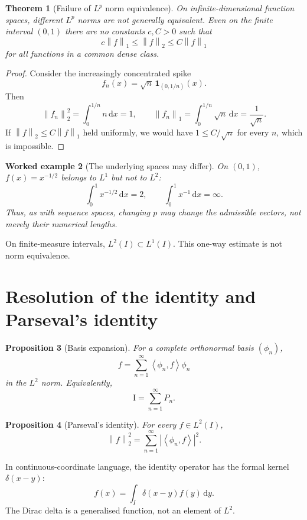\documentclass[11pt,a5paper,oneside,openany]{scrreprt}
\theoremstyle{notes}
\newtheorem{theorem}{Theorem}[section]
\newtheorem{proposition}[theorem]{Proposition}
\theoremstyle{definitions}
\newtheorem{example}[theorem]{Worked example}
\newcommand{\ip}[2]{\left\langle #1,#2\right\rangle}
\newcommand{\norm}[1]{\left\lVert #1\right\rVert}
\newcommand{\Id}{\mathrm{I}}
\newcommand{\dd}{\,\mathrm{d}}
\newcommand{\one}{\mathbf{1}}
\begin{document}
\begin{theorem}[Failure of $L^p$ norm equivalence]
On infinite-dimensional function spaces, different $L^p$ norms are not
generally equivalent.  Even on the finite interval $(0,1)$ there are no
constants $c,C>0$ such that
\[
 c\norm{f}_1\le\norm{f}_2\le C\norm{f}_1
\]
for all functions in a common dense class.
\end{theorem}

\begin{proof}
Consider the increasingly concentrated spike
\[
 f_n(x)=\sqrt n\,\one_{(0,1/n)}(x).
\]
Then
\[
 \norm{f_n}_2^2=\int_0^{1/n}n\dd x=1,
 \qquad
 \norm{f_n}_1=\int_0^{1/n}\sqrt n\dd x=\frac1{\sqrt n}.
\]
If $\norm{f}_2\le C\norm{f}_1$ held uniformly, we would have
$1\le C/\sqrt n$ for every $n$, which is impossible.
\end{proof}

\begin{example}[The underlying spaces may differ]
On $(0,1)$, $f(x)=x^{-1/2}$ belongs to $L^1$ but not to $L^2$:
\[
 \int_0^1x^{-1/2}\dd x=2,
 \qquad
 \int_0^1x^{-1}\dd x=\infty.
\]
Thus, as with sequence spaces, changing $p$ may change the admissible vectors,
not merely their numerical lengths.
\end{example}

\begin{caution}
On finite-measure intervals, $L^2(I)\subset L^1(I)$.  This one-way estimate is
not norm equivalence.
\end{caution}

\section{Resolution of the identity and Parseval's identity}

\begin{proposition}[Basis expansion]
For a complete orthonormal basis $(\phi_n)$,
\[
 f=\sum_{n=1}^{\infty}\ip{\phi_n}{f}\phi_n
\]
in the $L^2$ norm.  Equivalently,
\[
 \boxed{\Id=\sum_{n=1}^{\infty}P_n}.
\]
\end{proposition}

\begin{proposition}[Parseval's identity]
For every $f\in L^2(I)$,
\[
  \boxed{\norm{f}_2^2
  =\sum_{n=1}^{\infty}|\ip{\phi_n}{f}|^2}.
\]
\end{proposition}

In continuous-coordinate language, the identity operator has the formal
kernel $\delta(x-y)$:
\[
 f(x)=\int_I\delta(x-y)f(y)\dd y.
\]
The Dirac delta is a generalised function, not an element of $L^2$.
\end{document}

